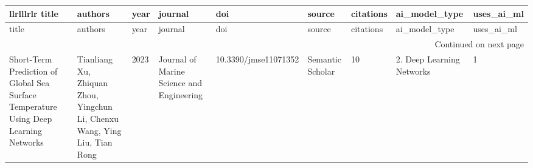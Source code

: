 \begin{longtable}{lllllllll}{llrlllrlr}
\toprule
title & authors & year & journal & doi & source & citations & ai_model_type & uses_ai_ml \\
\midrule
\endfirsthead
\toprule
title & authors & year & journal & doi & source & citations & ai_model_type & uses_ai_ml \\
\midrule
\endhead
\midrule
\multicolumn{9}{r}{Continued on next page} \\
\midrule
\endfoot
\bottomrule
\endlastfoot
Short-Term Prediction of Global Sea Surface Temperature Using Deep Learning Networks & Tianliang Xu, Zhiquan Zhou, Yingchun Li, Chenxu Wang, Ying Liu, Tian Rong & 2023 & Journal of Marine Science and Engineering & 10.3390/jmse11071352 & Semantic Scholar & 10 & 2. Deep Learning Networks & 1 \\

\end{longtable}
